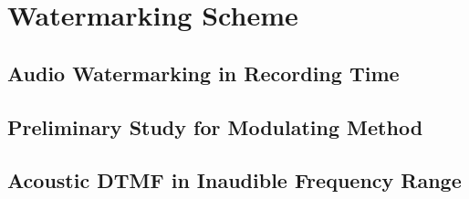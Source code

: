 \chapter{Watermarking Scheme}

\section{Audio Watermarking in Recording Time}


\section{Preliminary Study for Modulating Method}


%

\section{Acoustic DTMF in Inaudible Frequency Range} 

